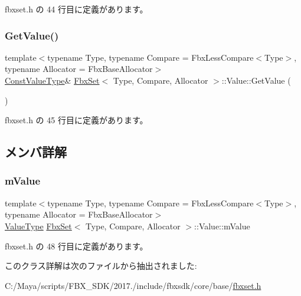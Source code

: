  fbxset.\+h の 44 行目に定義があります。

\mbox{\label{class_fbx_set_1_1_value_ae91a4001845b34f06c36b1e6fe966bf4}} 
\subsubsection{\texorpdfstring{Get\+Value()}{GetValue()}\hspace{0.1cm}{\footnotesize\ttfamily [2/2]}}
{\footnotesize\ttfamily template$<$typename Type, typename Compare = Fbx\+Less\+Compare$<$\+Type$>$, typename Allocator = Fbx\+Base\+Allocator$>$ \\
\hyperlink{class_fbx_set_1_1_value_a4b01735d9b84587bb21bd4a9d75e419b}{Const\+Value\+Type}\& \hyperlink{class_fbx_set}{Fbx\+Set}$<$ Type, Compare, Allocator $>$\+::Value\+::\+Get\+Value (\begin{DoxyParamCaption}{ }\end{DoxyParamCaption})\hspace{0.3cm}{\ttfamily [inline]}}



 fbxset.\+h の 45 行目に定義があります。



\subsection{メンバ詳解}
\mbox{\label{class_fbx_set_1_1_value_ae8a99bc167579b0edf8e131f4a7731a9}} 
\subsubsection{\texorpdfstring{m\+Value}{mValue}}
{\footnotesize\ttfamily template$<$typename Type, typename Compare = Fbx\+Less\+Compare$<$\+Type$>$, typename Allocator = Fbx\+Base\+Allocator$>$ \\
\hyperlink{class_fbx_set_1_1_value_aa4757d6676c438c18ab271c57997d8eb}{Value\+Type} \hyperlink{class_fbx_set}{Fbx\+Set}$<$ Type, Compare, Allocator $>$\+::Value\+::m\+Value\hspace{0.3cm}{\ttfamily [protected]}}



 fbxset.\+h の 48 行目に定義があります。



このクラス詳解は次のファイルから抽出されました\+:\begin{DoxyCompactItemize}
\item 
C\+:/\+Maya/scripts/\+F\+B\+X\+\_\+\+S\+D\+K/2017./include/fbxsdk/core/base/\hyperlink{fbxset_8h}{fbxset.\+h}\end{DoxyCompactItemize}
